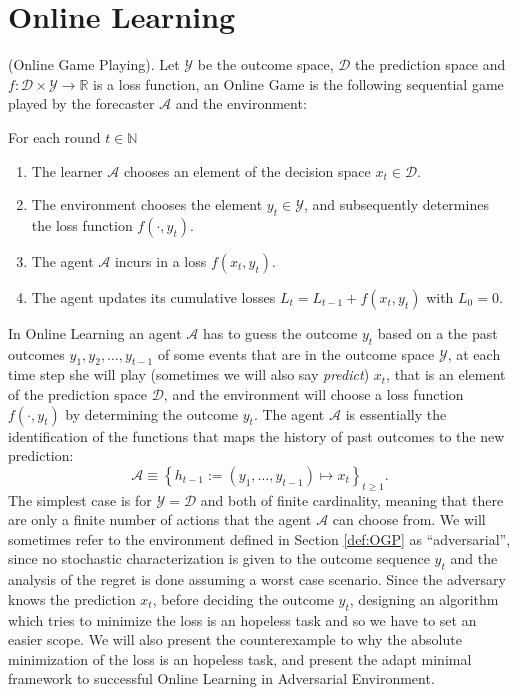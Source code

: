 \section{Online Learning}
\label{sec:OnlineLearning}
\begin{definition}(Online Game Playing).\label{def:OGP}
    Let $\mathcal Y$ be the outcome space, $\mathcal D$ the prediction space and $f:\mathcal D\times\mathcal Y\to \mathbb R$ is a loss function, an Online Game is the following sequential game played by the forecaster $\mathcal A$ and the environment:

    For each round $t\in \mathbb N$
    \begin{enumerate}
        \item The learner $\mathcal A$ chooses an element of the decision space $x_t\in\mathcal D$.
        \item The environment chooses the element $y_t\in\mathcal Y$, and subsequently determines the loss function $f(\cdot,y_t)$.
        \item The agent $\mathcal A$ incurs in a loss $f(x_t,y_t)$.
		\item The agent updates its cumulative losses $L_t=L_{t-1}+f(x_t,y_t)$ with $L_0=0$.
    \end{enumerate}
\end{definition}

In Online Learning an agent $\mathcal A$ has to guess the outcome $y_t$ based on a the past outcomes $y_1,y_2,\ldots,y_{t-1}$ of some events that are in the outcome space $\mathcal Y$, at each time step she will play (sometimes we will also say \emph{predict}) $x_t$, that is an element of the prediction space $\mathcal D$, and the environment will choose a loss function $f(\cdot,y_t)$ by determining the outcome $y_t$.
The agent $\mathcal A$ is essentially the identification of the functions that maps the history of past outcomes to the new prediction:
$$\mathcal A\equiv\left\{h_{t-1}:=(y_1,\ldots,y_{t-1})\longmapsto x_t\right\}_{t\ge 1}. $$
The simplest case is for $\mathcal Y=\mathcal D$ and both of finite cardinality, meaning that there are only a finite number of actions that the agent $\mathcal A$ can choose from. 
We will sometimes refer to the environment defined in Section \ref{def:OGP} as ``adversarial'', since no stochastic characterization is given to the outcome sequence $y_t$ and the analysis of the regret is done assuming a worst case scenario.
Since the adversary knows the prediction $x_t$, before deciding the outcome $y_t$, designing an algorithm which tries to minimize the loss is an hopeless task and so we have to set an easier scope. We will also present the counterexample to why the absolute minimization of the loss is an hopeless task, and present the adapt minimal framework to successful Online Learning in Adversarial Environment.


